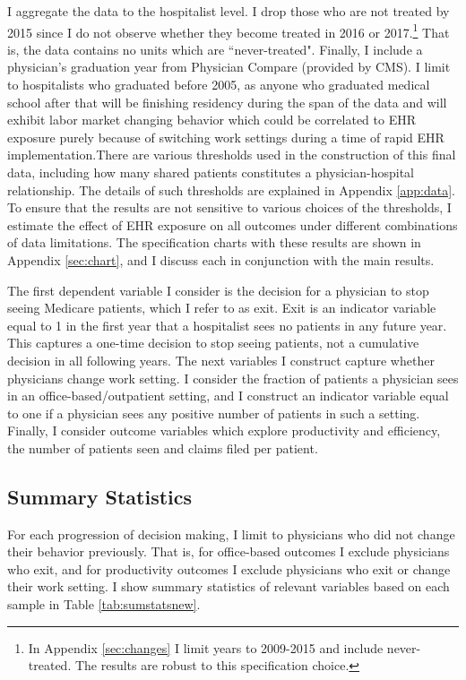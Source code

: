 \documentclass[12pt]{article}
\begin{document}
I aggregate the data to the hospitalist level. I drop those who are not treated by 2015 since I do not observe whether they become treated in 2016 or 2017.\footnote{In Appendix \ref{sec:changes} I limit years to 2009-2015 and include never-treated. The results are robust to this specification choice.} That is, the data contains no units which are ``never-treated". Finally, I include a physician's graduation year from Physician Compare (provided by CMS). I limit to hospitalists who graduated before 2005, as anyone who graduated medical school after that will be finishing residency during the span of the data and will exhibit labor market changing behavior which could be correlated to EHR exposure purely because of switching work settings during a time of rapid EHR implementation.There are various thresholds used in the construction of this final data, including how many shared patients constitutes a physician-hospital relationship. The details of such thresholds are explained in Appendix \ref{app:data}. To ensure that the results  are not sensitive to various choices of the thresholds, I estimate the effect of EHR exposure on all outcomes under different combinations of data limitations. The specification charts with these results are shown in Appendix \ref{sec:chart}, and I discuss each in conjunction with the main results. 

The first dependent variable I consider is the decision for a physician to stop seeing Medicare patients, which I refer to as exit. Exit is an indicator variable equal to 1 in the first year that a hospitalist sees no patients in any future year. This captures a one-time decision to stop seeing patients, not a cumulative decision in all following years. The next variables I construct capture whether physicians change work setting. I consider the fraction of patients a physician sees in an office-based/outpatient setting, and I construct an indicator variable equal to one if a physician sees any positive number of patients in such a setting. Finally, I consider outcome variables which explore productivity and efficiency, the number of patients seen and claims filed per patient.


\subsection{Summary Statistics}

For each progression of decision making, I limit to physicians who did not change their behavior previously. That is, for office-based outcomes I exclude physicians who exit, and for productivity outcomes I exclude physicians who exit or change their work setting. I show summary statistics of relevant variables based on each sample in Table \ref{tab:sumstatsnew}. 
\end{document}
